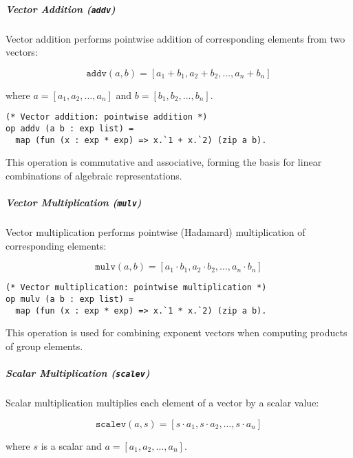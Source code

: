 \subparagraph{Vector Addition (\texttt{addv})}

Vector addition performs pointwise addition of corresponding elements from two vectors:

\begin{equation}
\texttt{addv}(a, b) = [a_1 + b_1, a_2 + b_2, \ldots, a_n + b_n]
\end{equation}

where $a = [a_1, a_2, \ldots, a_n]$ and $b = [b_1, b_2, \ldots, b_n]$.

\begin{lstlisting}[style=easycrypt, caption=Vector Addition, breaklines=true, breakatwhitespace=true, frame=single, keepspaces=true]
(* Vector addition: pointwise addition *)
op addv (a b : exp list) = 
  map (fun (x : exp * exp) => x.`1 + x.`2) (zip a b).
\end{lstlisting}

This operation is commutative and associative, forming the basis for linear combinations of algebraic representations.

\subparagraph{Vector Multiplication (\texttt{mulv})}

Vector multiplication performs pointwise (Hadamard) multiplication of corresponding elements:

\begin{equation}
\texttt{mulv}(a, b) = [a_1 \cdot b_1, a_2 \cdot b_2, \ldots, a_n \cdot b_n]
\end{equation}

\begin{lstlisting}[style=easycrypt, caption=Vector Multiplication, breaklines=true, breakatwhitespace=true, frame=single, keepspaces=true]
(* Vector multiplication: pointwise multiplication *)
op mulv (a b : exp list) = 
  map (fun (x : exp * exp) => x.`1 * x.`2) (zip a b).
\end{lstlisting}

This operation is used for combining exponent vectors when computing products of group elements.

\subparagraph{Scalar Multiplication (\texttt{scalev})}

Scalar multiplication multiplies each element of a vector by a scalar value:

\begin{equation}
\texttt{scalev}(a, s) = [s \cdot a_1, s \cdot a_2, \ldots, s \cdot a_n]
\end{equation}

where $s$ is a scalar and $a = [a_1, a_2, \ldots, a_n]$.

